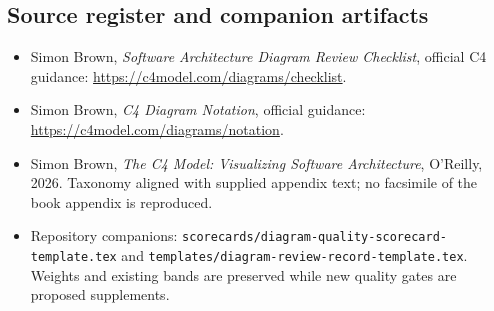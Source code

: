 \documentclass[10pt,letterpaper]{article}
\begin{document}
\subsection{Source register and companion artifacts}
\begin{itemize}
\item Simon Brown, \emph{Software Architecture Diagram Review Checklist}, official C4 guidance: \url{https://c4model.com/diagrams/checklist}.
\item Simon Brown, \emph{C4 Diagram Notation}, official guidance: \url{https://c4model.com/diagrams/notation}.
\item Simon Brown, \emph{The C4 Model: Visualizing Software Architecture}, O'Reilly, 2026. Taxonomy aligned with supplied appendix text; no facsimile of the book appendix is reproduced.
\item Repository companions: \nolinkurl{scorecards/diagram-quality-scorecard-template.tex} and \nolinkurl{templates/diagram-review-record-template.tex}. Weights and existing bands are preserved while new quality gates are proposed supplements.
\end{itemize}
\end{document}
